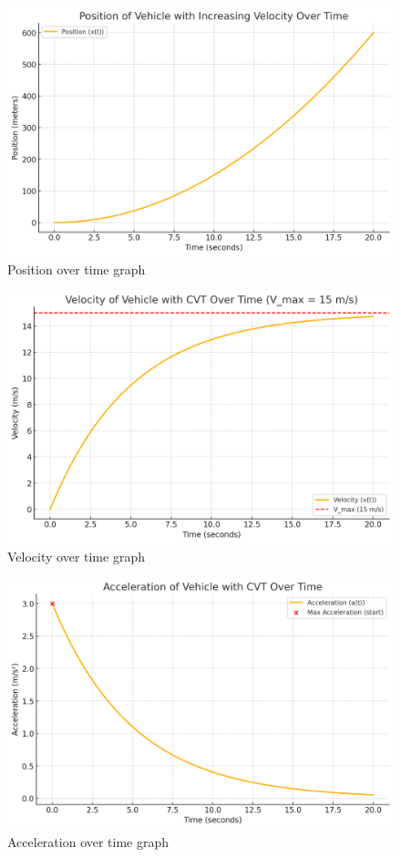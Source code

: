 \documentclass[12pt, titlepage]{article}
\begin{document}
\begin{figure}[H]
  \centering
  \includegraphics[width=\textwidth]{graphs/position.png}
  \caption{Position over time graph}
  \label{fig:position_graph}
\end{figure}

\begin{figure}[H]
  \centering
  \includegraphics[width=\textwidth]{graphs/velocity.png}
  \caption{Velocity over time graph}
  \label{fig:velocity_graph}
\end{figure}

\begin{figure}[H]
  \centering
  \includegraphics[width=\textwidth]{graphs/acceleration.png}
  \caption{Acceleration over time graph}
  \label{fig:acceleration_graph}
\end{figure}
\end{document}
